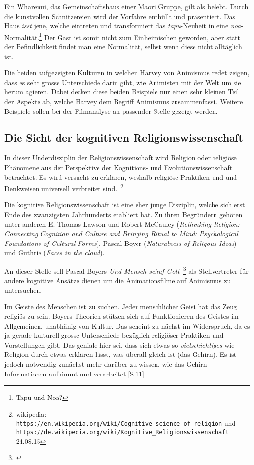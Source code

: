 Ein Wharenui, das Gemeinschaftshaus einer Maori Gruppe, gilt als belebt. Durch die kunstvollen Schnitzereien wird der Vorfahre enthüllt und präsentiert. Das Haus \emph{isst} jene, welche eintreten und transformiert das \emph{tapu}-Neuheit in eine \emph{noa}-Normalität.\footnote{Tapu und Noa?} Der Gast ist somit nicht zum Einheimischen geworden, aber statt der Befindlichkeit findet man eine Normalität, selbst wenn diese nicht alltäglich ist. 

\smallskip
Die beiden aufgezeigten Kulturen in welchen Harvey von Animismus redet zeigen, dass es sehr grosse Unterschiede darin gibt, wie Animisten mit der Welt um sie herum agieren. Dabei decken diese beiden Beispiele nur einen sehr kleinen Teil der Aspekte ab, welche Harvey dem Begriff Animismus zusammenfasst. Weitere Beispiele sollen bei der Filmanalyse an passender Stelle gezeigt werden.

\subsection{Die Sicht der kognitiven Religionswissenschaft}
In dieser Underdisziplin der Religionswissenschaft wird Religion oder religiöse Phänomene aus der Perspektive der Kognitions- und Evolutionswissenschaft betrachtet. Es wird versucht zu erklären, weshalb religiöse Praktiken und und Denkweisen universell verbreitet sind.~\footnote{wikipedia: \texttt{https://en.wikipedia.org/wiki/Cognitive\_science\_of\_religion} und \texttt{https://de.wikipedia.org/wiki/Kognitive\_Religionswissenschaft} 24.08.15}

Die kognitive Religionswissenschaft ist eine eher junge Disziplin, welche sich erst Ende des zwanzigsten Jahrhunderts etabliert hat. Zu ihren Begründern gehören unter anderen E. Thomas Lawson und Robert McCauley (\emph{Rethinking Religion: Connecting Cognition and Culture and Bringing Ritual to Mind: Psychological Foundations of Cultural Forms}), Pascal Boyer (\emph{Naturalness of Religous Ideas}) und Guthrie (\emph{Faces in the cloud}).

An dieser Stelle soll Pascal Boyers \emph{Und Mensch schuf Gott}~\footnote{\cite{boyer04}} als Stellvertreter für andere kognitive Ansätze dienen um die Animationsfilme auf Animismus zu untersuchen. 

Im Geiste des Menschen ist zu suchen. Jeder menschlicher Geist hat das Zeug religiös zu sein. Boyers Theorien stützen sich auf Funktionieren des Geistes im Allgemeinen, unabhänig von Kultur. Das scheint zu nächst im Widerspruch, da es ja gerade kulturell grosse Unterschiede bezüglich religiöser Praktiken und Vorstellungen gibt. Das geniale hier sei, dass sich etwas so \emph{vielschichtiges} wie Religion durch etwas erklären lässt, was überall gleich ist (das Gehirn). Es ist jedoch notwendig zunächst mehr darüber zu wissen, wie das Gehirn Informationen aufnimmt und verarbeitet.[S.11]

